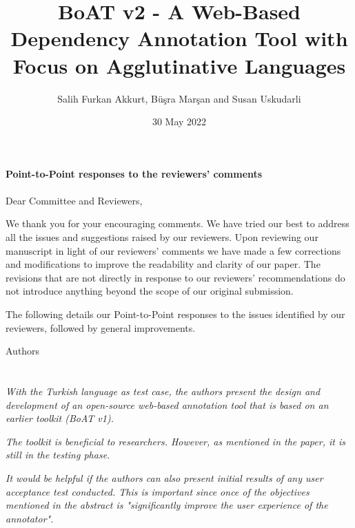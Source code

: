 \documentclass[final,2p]{article}
\newcommand{\comment}{\emph}
\begin{document}
%
\title{BoAT v2 - A Web-Based Dependency Annotation Tool with Focus on Agglutinative Languages}%
\author{Salih Furkan Akkurt, Büşra Marşan and Susan Uskudarli}
\date{30 May 2022}

\maketitle

\textbf{Point-to-Point responses to the reviewers' comments}\\\\


Dear Committee and Reviewers,

We thank you for your encouraging comments.
We have tried our best to address all the issues and suggestions raised by our reviewers.
Upon reviewing our manuscript in light of our reviewers' comments we have made a few corrections and modifications to improve the readability and clarity of our paper.
The revisions that are not directly in response to our reviewers' recommendations do not introduce anything beyond the scope of our original submission.

The following details our Point-to-Point responses to the issues identified by our reviewers, followed by general improvements.

Authors

\section*{}

\comment{With the Turkish language as test case, the authors present the design and development of an open-source web-based annotation tool that is based on an earlier toolkit (BoAT v1).}

\comment{The toolkit is beneficial to researchers. However, as mentioned in the paper, it is still in the testing phase.}

\comment{It would be helpful if the authors can also present initial results of any user acceptance test conducted. This is important since once of the objectives mentioned in the abstract is "significantly improve the user experience of the annotator".}
\end{document}
